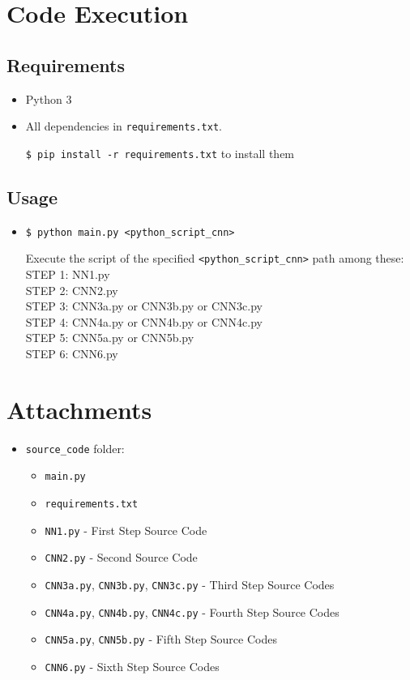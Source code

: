 \documentclass[a4paper, 11pt]{article}
\begin{document}
	\FloatBarrier
	
	
		
	\section{Code Execution}
	\subsection{Requirements}
	\begin{itemize}
		\item Python 3
		\item All dependencies in \texttt{requirements.txt}.
		
		\texttt{\$ pip install -r requirements.txt} to install them
	\end{itemize}
	\subsection{Usage}
	\begin{itemize}
		\item \texttt{\$ python main.py <python\_script\_cnn>}
		
		Execute the script of the specified \texttt{<python\_script\_cnn>} path among these: \\
		STEP 1: NN1.py\\
		STEP 2: CNN2.py\\
		STEP 3: CNN3a.py or CNN3b.py or CNN3c.py\\
		STEP 4: CNN4a.py or CNN4b.py or CNN4c.py\\
		STEP 5: CNN5a.py or CNN5b.py\\
		STEP 6: CNN6.py\\
		
	\end{itemize}
	
	\section*{Attachments}
	\begin{itemize}
		\item \texttt{source\_code} folder:
		\begin{itemize}
			\item \texttt{main.py}
			\item \texttt{requirements.txt}
			\item \texttt{NN1.py} - First Step Source Code
			\item \texttt{CNN2.py} - Second Source Code
			\item \texttt{CNN3a.py}, \texttt{CNN3b.py}, \texttt{CNN3c.py} - Third Step Source Codes
			\item \texttt{CNN4a.py}, \texttt{CNN4b.py}, \texttt{CNN4c.py} - Fourth Step Source Codes
			\item \texttt{CNN5a.py}, \texttt{CNN5b.py} - Fifth Step Source Codes
			\item \texttt{CNN6.py} - Sixth Step Source Codes
		\end{itemize}
	\end{itemize}

	
\end{document}
